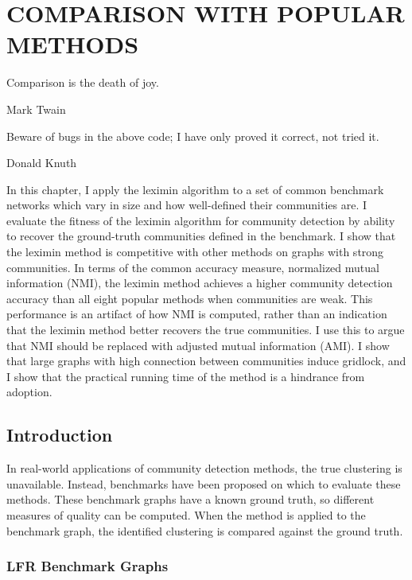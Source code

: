 \chapter{COMPARISON WITH POPULAR METHODS} \label{ch:comparison}%

\epigraph{Comparison is the death of joy.}{Mark Twain}

\epigraph{Beware of bugs in the above code; I have only proved it correct, not tried it.}{Donald Knuth}



\noindent In this chapter, I apply the leximin algorithm to a set of common benchmark networks which vary in size and how well-defined their communities are. I evaluate the fitness of the leximin algorithm for community detection by ability to recover the ground-truth communities defined in the benchmark. I show that the leximin method is competitive with other methods on graphs with strong communities. In terms of the common accuracy measure, normalized mutual information (NMI), the leximin method achieves a higher community detection accuracy than all eight popular methods when communities are weak. This performance is an artifact of how NMI is computed, rather than an indication that the leximin method better recovers the true communities. I use this to argue that NMI should be replaced with adjusted mutual information (AMI). I show that large graphs with high connection between communities induce gridlock, and I show that the practical running time of the method is a hindrance from adoption.



\section{Introduction}

In real-world applications of community detection methods, the true clustering is unavailable. Instead, benchmarks have been proposed on which to evaluate these methods. These benchmark graphs have a known ground truth, so different measures of quality can be computed. When the method is applied to the benchmark graph, the identified clustering is compared against the ground truth. 



\subsection{LFR Benchmark Graphs}

